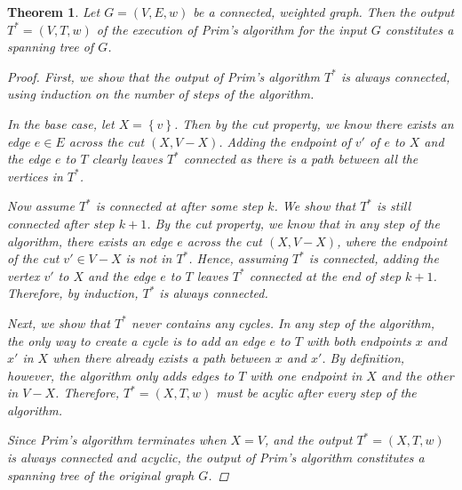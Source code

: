 \documentclass[a4paper,11pt]{report}
\theoremstyle{plain}
\newtheorem{thm}{Theorem}[section]
\theoremstyle{definition}
\begin{document}
\begin{thm}
Let $G = (V, E, w)$ be a connected, weighted graph. Then the output
$T^* = (V, T, w)$ of the execution of Prim's algorithm for the input $G$
constitutes a spanning tree of $G$.

\begin{proof}
First, we show that the output of Prim's algorithm $T^*$ is always connected,
using induction on the number of steps of the algorithm.

In the base case, let $X = \left\{v\right\}$. Then by the cut property, we
know there exists an edge $e \in E$ across the cut $(X, V - X)$. Adding the
endpoint of $v'$ of $e$ to $X$ and the edge $e$ to $T$ clearly leaves $T^*$
connected as there is a path between all the vertices in $T^*$.

Now assume $T^*$ is connected at after some step $k$. We show that $T^*$ is
still connected after step $k + 1$. By the cut property, we know that in any
step of the algorithm, there exists an edge $e$ across the cut $(X, V - X)$,
where the endpoint of the cut $v' \in V - X$ is not in $T^*$. Hence, assuming
$T^*$ is connected, adding the vertex $v'$ to $X$ and the edge $e$ to $T$
leaves $T^*$ connected at the end of step $k + 1$. Therefore, by induction,
$T^*$ is always connected.

Next, we show that $T^*$ never contains any cycles. In any step of the
algorithm, the only way to create a cycle is to add an edge $e$ to $T$
with both endpoints $x$ and $x'$ in $X$ when there already exists a path
between $x$ and $x'$. By definition, however, the algorithm only adds edges
to $T$ with one endpoint in $X$ and the other in $V - X$. Therefore,
$T^* = (X, T, w)$ must be acylic after every step of the algorithm.

Since Prim's algorithm terminates when $X = V$, and the output
$T^* = (X, T, w)$ is always connected and acyclic, the output of Prim's
algorithm constitutes a spanning tree of the original graph $G$.
\end{proof}
\end{thm}
\end{document}

